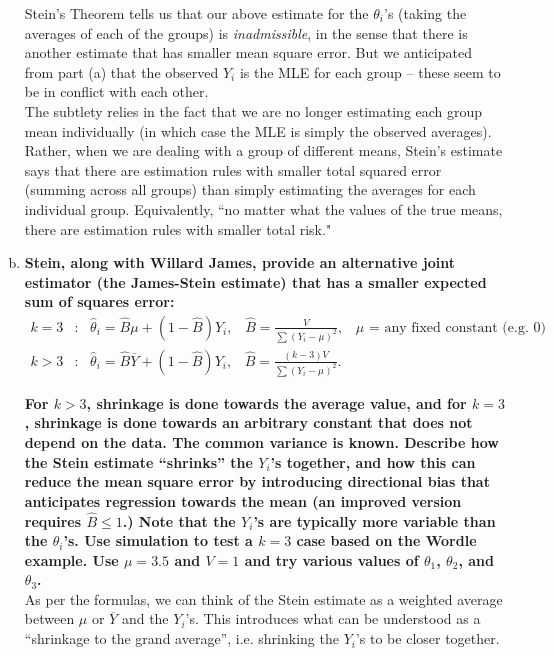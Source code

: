 \begin{enumerate}[a)]
    Stein's Theorem tells us that our above estimate for the $\theta_i$'s (taking the averages of each of the groups) is \textit{inadmissible}, in the sense that there is another estimate that has smaller mean square error. 
    But we anticipated from part (a) that the observed $Y_i$ is the MLE for each group -- these seem to be in conflict with each other. \\

    The subtlety relies in the fact that we are no longer estimating each group mean individually (in which case the MLE is simply the observed averages). Rather, when we are dealing with a group of different means, Stein's estimate says that there are estimation rules with smaller total squared error (summing across all groups) than simply estimating the averages for each individual group. Equivalently, ``no matter what the values of the true means, there are estimation rules with smaller total risk." \\
    
    \item \textbf{Stein, along with Willard James, provide an alternative joint estimator (the James-Stein
    estimate) that has a smaller expected sum of squares error:}
    \begin{align*}
        k = 3&\colon \, \, \, \, \hat{\theta}_i = \hat{B} \mu + (1-\hat{B})Y_i, \,\, \, \, \, \hat{B} = \frac{V}{\sum (Y_i - \mu)^2}, \, \, \, \, \, \mu \text{ = any fixed constant (e.g. 0)} \\
        k > 3&\colon \, \, \, \, \hat{\theta}_i = \hat{B}\overline{Y}+ (1-\hat{B})Y_i, \, \, \, \, \,\hat{B} = \frac{(k-3)V}{\sum (Y_i - \mu)^2}.
    \end{align*}

    \textbf{For $k > 3$, shrinkage is done towards the average value, and for $k=3$, shrinkage is done towards an arbitrary constant that does not depend on the data. The common variance is known.
    Describe how the Stein estimate ``shrinks'' the $Y_i$'s together, and how this can reduce the mean square error by introducing directional bias that anticipates regression towards the mean (an improved version requires $\hat{B} \leq 1$.)
    Note that the $Y_i$'s are typically more variable than the $\theta_i$'s. Use simulation to test a $k=3$ case based on the Wordle example. Use $\mu = 3.5$ and $V=1$ and try various values of  $\theta_1$, $\theta_2$, and $\theta_3$.} \\

    As per the formulas, we can think of the Stein estimate as a weighted average between $\mu$ or $\overline{Y}$ and the $Y_i$'s. This introduces what can be understood as a ``shrinkage to the grand average'', i.e. shrinking the $Y_i$'s to be closer together. \\
    

\end{enumerate}
